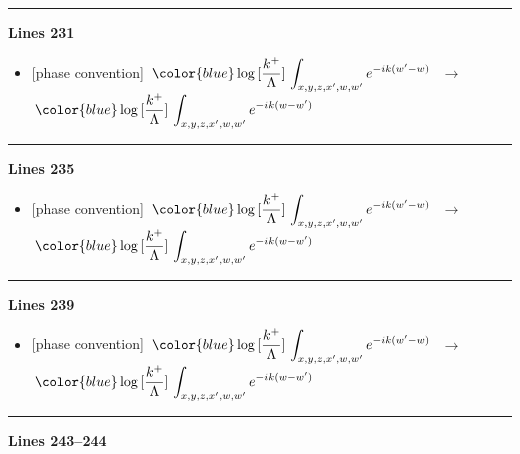 \documentclass[10pt]{article}
\begin{document}
\noindent\rule{\linewidth}{0.3pt}\par\noindent\textbf{Lines 231} \par
\begin{itemize}[leftmargin=2.2em,itemsep=1pt,topsep=2pt]
\item[\textbf{l.231}] \textsf{\small [phase convention]} $\displaystyle \, {\color{blue}\log{[\frac{k^{+}}{\Lambda}]}}\, \int_{x,y,z,x^{\prime},w,w^{\prime}}e^{-ik(w^{\prime}-w)}\,$\ $\longrightarrow$\ $\displaystyle \, {\color{blue}\log{[\frac{k^{+}}{\Lambda}]}}\, \int_{x,y,z,x^{\prime},w,w^{\prime}}e^{-ik(w-w^{\prime})}\,$
\end{itemize}
\noindent\rule{\linewidth}{0.3pt}\par\noindent\textbf{Lines 235} \par
\begin{itemize}[leftmargin=2.2em,itemsep=1pt,topsep=2pt]
\item[\textbf{l.235}] \textsf{\small [phase convention]} $\displaystyle \, {\color{blue}\log{[\frac{k^{+}}{\Lambda}]}}\, \int_{x,y,z,x^{\prime},w,w^{\prime}}e^{-ik(w^{\prime}-w)}\,$\ $\longrightarrow$\ $\displaystyle \, {\color{blue}\log{[\frac{k^{+}}{\Lambda}]}}\, \int_{x,y,z,x^{\prime},w,w^{\prime}}e^{-ik(w-w^{\prime})}\,$
\end{itemize}
\noindent\rule{\linewidth}{0.3pt}\par\noindent\textbf{Lines 239} \par
\begin{itemize}[leftmargin=2.2em,itemsep=1pt,topsep=2pt]
\item[\textbf{l.239}] \textsf{\small [phase convention]} $\displaystyle \, {\color{blue}\log{[\frac{k^{+}}{\Lambda}]}}\,\int_{x,y,z,x^{\prime},w,w^{\prime}}e^{-ik(w^{\prime}-w)}\,$\ $\longrightarrow$\ $\displaystyle \, {\color{blue}\log{[\frac{k^{+}}{\Lambda}]}}\,\int_{x,y,z,x^{\prime},w,w^{\prime}}e^{-ik(w-w^{\prime})}\,$
\end{itemize}
\noindent\rule{\linewidth}{0.3pt}\par\noindent\textbf{Lines 243--244} \par
\end{document}
